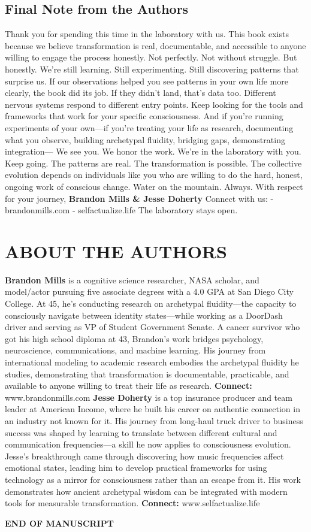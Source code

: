 \section{Final Note from the Authors}

Thank you for spending this time in the laboratory with us.
This book exists because we believe transformation is real, documentable, and accessible to anyone willing to engage the process honestly. Not perfectly. Not without struggle. But honestly.
We're still learning. Still experimenting. Still discovering patterns that surprise us.
If our observations helped you see patterns in your own life more clearly, the book did its job.
If they didn't land, that's data too. Different nervous systems respond to different entry points. Keep looking for the tools and frameworks that work for your specific consciousness.
And if you're running experiments of your own—if you're treating your life as research, documenting what you observe, building archetypal fluidity, bridging gaps, demonstrating integration—
We see you. We honor the work. We're in the laboratory with you.
Keep going.
The patterns are real. The transformation is possible. The collective evolution depends on individuals like you who are willing to do the hard, honest, ongoing work of conscious change.
Water on the mountain. Always.
With respect for your journey,
\textbf{Brandon Mills \& Jesse Doherty}
Connect with us:
- brandonmills.com
- selfactualize.life
The laboratory stays open.

\cleardoublepage

\chapter{ABOUT THE AUTHORS}

\textbf{Brandon Mills} is a cognitive science researcher, NASA scholar, and model/actor pursuing five associate degrees with a 4.0 GPA at San Diego City College. At 45, he's conducting research on archetypal fluidity—the capacity to consciously navigate between identity states—while working as a DoorDash driver and serving as VP of Student Government Senate.
A cancer survivor who got his high school diploma at 43, Brandon's work bridges psychology, neuroscience, communications, and machine learning. His journey from international modeling to academic research embodies the archetypal fluidity he studies, demonstrating that transformation is documentable, practicable, and available to anyone willing to treat their life as research.
\textbf{Connect:} www.brandonmills.com
\textbf{Jesse Doherty} is a top insurance producer and team leader at American Income, where he built his career on authentic connection in an industry not known for it. His journey from long-haul truck driver to business success was shaped by learning to translate between different cultural and communication frequencies—a skill he now applies to consciousness evolution.
Jesse's breakthrough came through discovering how music frequencies affect emotional states, leading him to develop practical frameworks for using technology as a mirror for consciousness rather than an escape from it. His work demonstrates how ancient archetypal wisdom can be integrated with modern tools for measurable transformation.
\textbf{Connect:} www.selfactualize.life

\cleardoublepage

\textbf{END OF MANUSCRIPT}